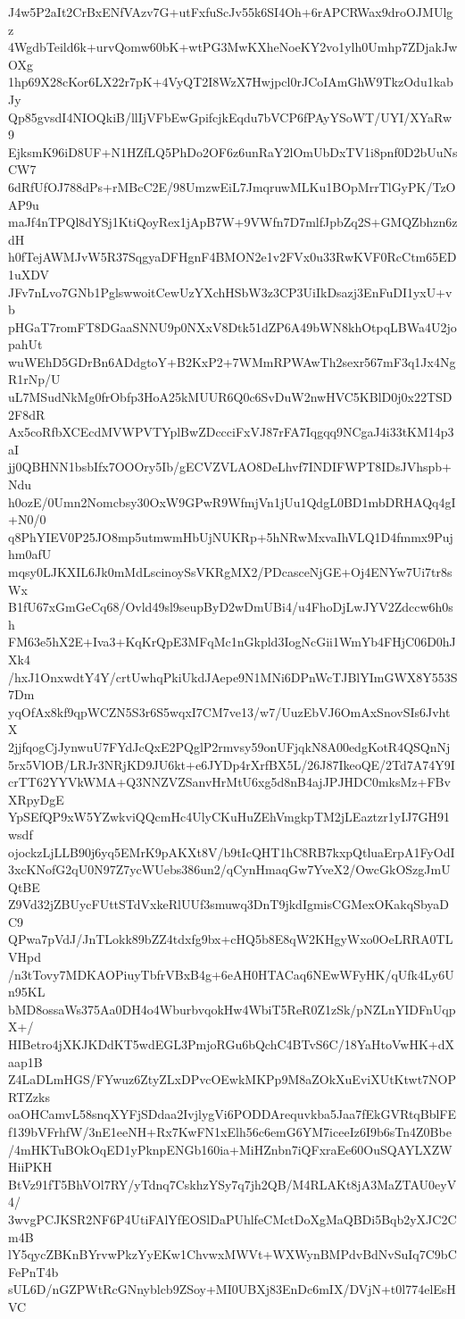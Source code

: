 J4w5P2aIt2CrBxENfVAzv7G+utFxfuScJv55k6SI4Oh+6rAPCRWax9droOJMUlgz
4WgdbTeild6k+urvQomw60bK+wtPG3MwKXheNoeKY2vo1ylh0Umhp7ZDjakJwOXg
1hp69X28cKor6LX22r7pK+4VyQT2I8WzX7Hwjpcl0rJCoIAmGhW9TkzOdu1kabJy
Qp85gvsdI4NIOQkiB/llIjVFbEwGpifcjkEqdu7bVCP6fPAyYSoWT/UYI/XYaRw9
EjksmK96iD8UF+N1HZfLQ5PhDo2OF6z6unRaY2lOmUbDxTV1i8pnf0D2bUuNsCW7
6dRfUfOJ788dPs+rMBcC2E/98UmzwEiL7JmqruwMLKu1BOpMrrTlGyPK/TzOAP9u
maJf4nTPQl8dYSj1KtiQoyRex1jApB7W+9VWfn7D7mlfJpbZq2S+GMQZbhzn6zdH
h0fTejAWMJvW5R37SqgyaDFHgnF4BMON2e1v2FVx0u33RwKVF0RcCtm65ED1uXDV
JFv7nLvo7GNb1PglswwoitCewUzYXchHSbW3z3CP3UiIkDsazj3EnFuDI1yxU+vb
pHGaT7romFT8DGaaSNNU9p0NXxV8Dtk51dZP6A49bWN8khOtpqLBWa4U2jopahUt
wuWEhD5GDrBn6ADdgtoY+B2KxP2+7WMmRPWAwTh2sexr567mF3q1Jx4NgR1rNp/U
uL7MSudNkMg0frObfp3HoA25kMUUR6Q0c6SvDuW2nwHVC5KBlD0j0x22TSD2F8dR
Ax5coRfbXCEcdMVWPVTYplBwZDccciFxVJ87rFA7Iqgqq9NCgaJ4i33tKM14p3aI
jj0QBHNN1bsbIfx7OOOry5Ib/gECVZVLAO8DeLhvf7INDIFWPT8IDsJVhspb+Ndu
h0ozE/0Umn2Nomcbsy30OxW9GPwR9WfmjVn1jUu1QdgL0BD1mbDRHAQq4gI+N0/0
q8PhYIEV0P25JO8mp5utmwmHbUjNUKRp+5hNRwMxvaIhVLQ1D4fmmx9Pujhm0afU
mqsy0LJKXIL6Jk0mMdLscinoySsVKRgMX2/PDcasceNjGE+Oj4ENYw7Ui7tr8sWx
B1fU67xGmGeCq68/Ovld49sl9seupByD2wDmUBi4/u4FhoDjLwJYV2Zdccw6h0sh
FM63e5hX2E+Iva3+KqKrQpE3MFqMc1nGkpld3IogNcGii1WmYb4FHjC06D0hJXk4
/hxJ1OnxwdtY4Y/crtUwhqPkiUkdJAepe9N1MNi6DPnWcTJBlYImGWX8Y553S7Dm
yqOfAx8kf9qpWCZN5S3r6S5wqxI7CM7ve13/w7/UuzEbVJ6OmAxSnovSIs6JvhtX
2jjfqogCjJynwuU7FYdJcQxE2PQglP2rmvsy59onUFjqkN8A00edgKotR4QSQnNj
5rx5VlOB/LRJr3NRjKD9JU6kt+e6JYDp4rXrfBX5L/26J87IkeoQE/2Td7A74Y9I
crTT62YYVkWMA+Q3NNZVZSanvHrMtU6xg5d8nB4ajJPJHDC0mksMz+FBvXRpyDgE
YpSEfQP9xW5YZwkviQQcmHc4UlyCKuHuZEhVmgkpTM2jLEaztzr1yIJ7GH91wsdf
ojockzLjLLB90j6yq5EMrK9pAKXt8V/b9tIcQHT1hC8RB7kxpQtluaErpA1FyOdI
3xcKNofG2qU0N97Z7ycWUebs386un2/qCynHmaqGw7YveX2/OwcGkOSzgJmUQtBE
Z9Vd32jZBUycFUttSTdVxkeRlUUf3smuwq3DnT9jkdIgmisCGMexOKakqSbyaDC9
QPwa7pVdJ/JnTLokk89bZZ4tdxfg9bx+cHQ5b8E8qW2KHgyWxo0OeLRRA0TLVHpd
/n3tTovy7MDKAOPiuyTbfrVBxB4g+6eAH0HTACaq6NEwWFyHK/qUfk4Ly6Un95KL
bMD8ossaWs375Aa0DH4o4WburbvqokHw4WbiT5ReR0Z1zSk/pNZLnYIDFnUqpX+/
HIBetro4jXKJKDdKT5wdEGL3PmjoRGu6bQchC4BTvS6C/18YaHtoVwHK+dXaap1B
Z4LaDLmHGS/FYwuz6ZtyZLxDPvcOEwkMKPp9M8aZOkXuEviXUtKtwt7NOPRTZzks
oaOHCamvL58snqXYFjSDdaa2IvjlygVi6PODDArequvkba5Jaa7fEkGVRtqBblFE
f139bVFrhfW/3nE1eeNH+Rx7KwFN1xElh56c6emG6YM7iceeIz6I9b6sTn4Z0Bbe
/4mHKTuBOkOqED1yPknpENGb160ia+MiHZnbn7iQFxraEe60OuSQAYLXZWHiiPKH
BtVz91fT5BhVOl7RY/yTdnq7CskhzYSy7q7jh2QB/M4RLAKt8jA3MaZTAU0eyV4/
3wvgPCJKSR2NF6P4UtiFAlYfEOSlDaPUhlfeCMctDoXgMaQBDi5Bqb2yXJC2Cm4B
lY5qycZBKnBYrvwPkzYyEKw1ChvwxMWVt+WXWynBMPdvBdNvSuIq7C9bCFePnT4b
sUL6D/nGZPWtRcGNnyblcb9ZSoy+MI0UBXj83EnDc6mIX/DVjN+t0l774elEsHVC
